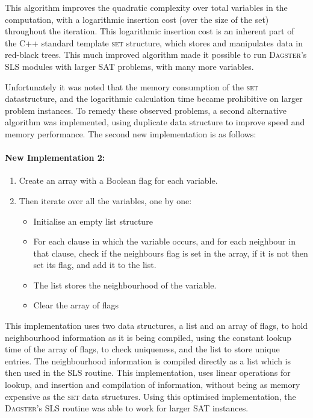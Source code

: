 \documentclass[10pt,a4paper,oneside,headinclude,footinclude,BCOR5mm]{scrartcl}
\newcommand{\dagster}{\textsc{Dagster}\xspace}
\begin{document}
This algorithm improves the quadratic complexity over total variables in the computation, with a logarithmic insertion cost (over the size of the set) throughout the iteration.
This logarithmic insertion cost is an inherent part of the \textsc{C++} standard template \textsc{set} structure, which stores and manipulates data in red-black trees.
This much improved algorithm made it possible to run \dagster's SLS modules with larger SAT problems, with many more variables.

Unfortunately it was noted that the memory consumption of the \textsc{set} datastructure, and the logarithmic calculation time became prohibitive on larger problem instances.
To remedy these observed problems, a second alternative algorithm was implemented, using duplicate data structure to improve speed and memory performance. The second new implementation is as follows:

\paragraph{New Implementation 2:}
\begin{enumerate}
\item Create an array with a Boolean flag for each variable.
\item Then iterate over all the variables, one by one:
\begin{itemize} 
\item Initialise an empty list structure
\item For each clause in which the variable occurs, and for each neighbour in that clause, check if the neighbours flag is set in the array, if it is not then set its flag, and add it to the list.
\item The list stores the  neighbourhood of the variable.
\item Clear the array of flags
\end{itemize}
\end{enumerate}

This implementation uses two data structures, a list and an array of flags, to hold neighbourhood information as it is being compiled, using the constant lookup time of the array of flags, to check uniqueness, and the list to store unique entries.
The neighbourhood information is compiled directly as a list which is then used in the SLS routine.
This implementation, uses linear operations for lookup, and insertion and compilation of information, without being as memory expensive as the \textsc{set} data structures.
Using this optimised implementation, the \dagster's SLS routine was able to work for larger SAT instances.
\end{document}
